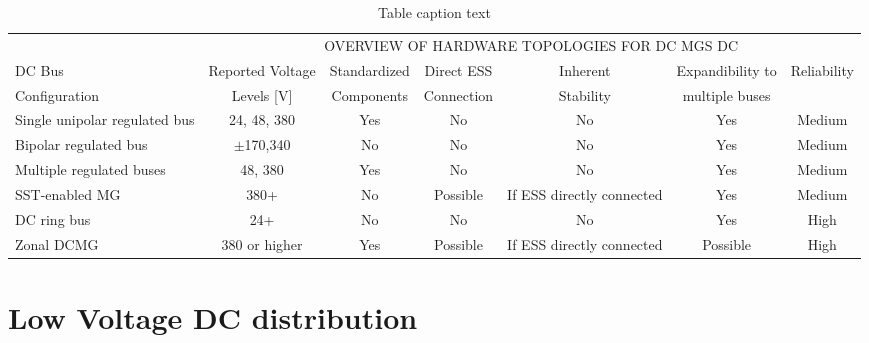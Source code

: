 \documentclass[]{scrartcl}
\begin{document}
\begin{table}[h!]
	\centering 
	\begin{adjustbox}{width=1\textwidth}
		\small
		\begin{tabular}{l c c c c c c} 
			& \multicolumn{6}{c}{OVERVIEW OF HARDWARE TOPOLOGIES FOR DC MGS DC} \\ 
			\cmidrule(l){2-7}
			DC Bus  & Reported Voltage & Standardized & Direct ESS   & Inherent  & Expandibility to   & Reliability \\ %
			Configuration &  Levels [V] &  Components &  Connection &  Stability &  multiple buses &  \\
			\midrule %
			\midrule
			Single unipolar regulated bus & 24, 48, 380 & Yes & No & No & Yes & Medium\\ %
			Bipolar regulated bus & $\pm$170,340  & No & No & No & Yes & Medium\\ %
			Multiple regulated buses &  48, 380 & Yes & No & No & Yes & Medium\\ %
			SST-enabled MG & 380+ & No & Possible & If ESS directly connected  & Yes & Medium \\ %
			DC ring bus & 24+ & No & No & No & Yes & High\\ %
			Zonal DCMG & 380 or higher & Yes & Possible & If ESS directly connected & Possible & High\\ %
			\bottomrule %
		\end{tabular}
	\end{adjustbox}
	\caption{Table caption text} %
	\label{tab:template} %
\end{table}







\newpage
\section{Low Voltage DC distribution}
\end{document}
